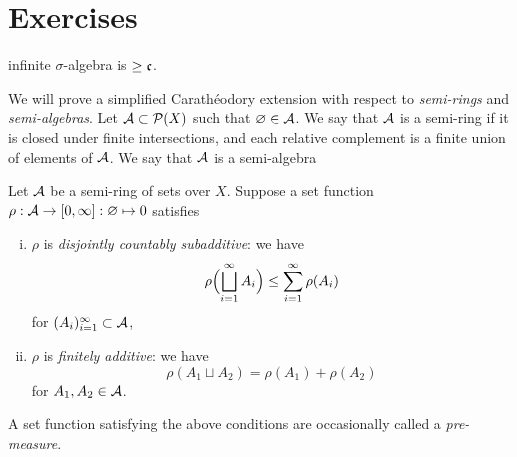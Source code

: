 \documentclass{../../large}
\begin{document}
\begin{prb}
\end{prb}

\begin{prb}
\end{prb}

\begin{prb}
\end{prb}




\section*{Exercises}
\begin{prb}

\end{prb}

\begin{prb}[Cardinalities]
infinite $\sigma$-algebra is $\ge\mathfrak{c}$.

\end{prb}

\begin{prb}
We will prove a simplified Carath\'eodory extension with respect to \emph{semi-rings} and \emph{semi-algebras}.
Let $\mathcal{A}\subset\mathcal{P}(X)$ such that $\varnothing\in\mathcal{A}$.
We say that $\mathcal{A}$ is a semi-ring if it is closed under finite intersections, and each relative complement is a finite union of elements of $\mathcal{A}$.
We say that $\mathcal{A}$ is a semi-algebra

Let $\mathcal{A}$ be a semi-ring of sets over $X$.
Suppose a set function $\rho:\mathcal{A}\to[0,\infty]:\varnothing\mapsto0$ satisfies
\begin{enumerate}[(i)]
\item $\rho$ is \emph{disjointly countably subadditive}: we have
\[\rho\Bigl(\bigsqcup_{i=1}^\infty A_i\Bigr)\le\sum_{i=1}^\infty\rho(A_i)\]
for $(A_i)_{i=1}^\infty\subset\mathcal{A}$,
\item $\rho$ is \emph{finitely additive}: we have
\[\rho(A_1\sqcup A_2)=\rho(A_1)+\rho(A_2)\]
for $A_1,A_2\in\mathcal{A}$.
\end{enumerate}
A set function satisfying the above conditions are occasionally called a \emph{pre-measure}.
\begin{parts}
\item
\item 
\end{parts}
\end{prb}
\end{document}
